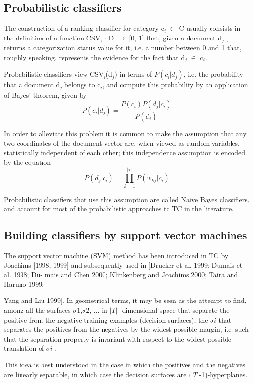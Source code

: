 \subsection{Probabilistic classifiers}
The construction of a ranking classifier for category c$_{i}$ $\in$ C usually
consists in the definition of a function CSV$_{i}$ : D $\rightarrow$ [0, 1] 
that, given a document d$_{j}$ , returns a categorization status value for it, 
i.e. a number between 0 and 1 that, roughly speaking, represents the evidence 
for the fact that d$_{j}$ $\in$ c$_{i}$.

Probabilistic classifiers view CSV$_{i}$(d$_{j}$) in terms of $P(c_{i} | d_{j})$, 
i.e. the probability that a document d$_{j}$ belongs to c$_{i}$, and compute this 
probability by an application of Bayes’ theorem, given by 
\[ P(c_{i}|d_{j}) = \frac{P(c_{i})P(d_{j}|c_{i})}{P(d_{j})} \]

In order to alleviate this problem it is common to make the assumption that 
any two coordinates of the document vector are, when viewed as random variables, 
statistically independent of each other; this independence assumption is 
encoded by the equation
\[ P(d_{j}|c_{i}) = \prod_{k=1}^{|\tau|} P(w_{kj}|c_{i}) \]

Probabilistic classifiers that use this assumption are called Naive Bayes classifiers, 
and account for most of the probabilistic approaches to TC in the literature.

\subsection{Building classifiers by support vector machines}
The support vector machine (SVM) method has been introduced in TC by Joachims 
[1998, 1999] and subsequently used in [Drucker et al. 1999; Dumais et al. 1998; 
Du- mais and Chen 2000; Klinkenberg and Joachims 2000; Taira and Haruno 1999;

Yang and Liu 1999]. In geometrical terms, it may be seen as the attempt to
find, among all the surfaces $\sigma 1$,$ \sigma 2$, ... in $|T|$ -dimensional
space that separate the positive from the negative training examples (decision
surfaces), the $\sigma i$ that separates the positives from the negatives by the 
widest possible margin, i.e. such that the separation property is invariant with 
respect to the widest possible translation of $\sigma i$ .

This idea is best understood in the case in which the positives and the
negatives are linearly separable, in which case the decision surfaces are
($|T|$-1)-hyperplanes.

